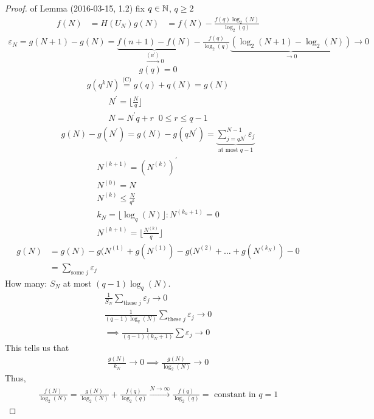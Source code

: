 \documentclass[mfit.tex]{subfiles}
\begin{document}
\begin{proof} of Lemma (2016-03-15, 1.2)
  fix $q \in \mathbb{N}$, $q \geq 2$
  \begin{align*}
    f(N) &= H(U_N)
    g(N) &= f(N) - \frac{f(q) \log_2(N)}{\log_2(q)}
  \end{align*}
  \begin{align*}
    \varepsilon_N = g(N+1) - g(N) = \underbrace{f(n+1) - f(N)}_{\overset{(B^\ast)}{\to} 0} - \frac{f(q)}{\log_2(q)} \underbrace{(\log_2(N+1) - \log_2(N))}_{\to 0} \to 0
  \end{align*}
  \[ g(q) = 0 \]
  \begin{align*}
    g(q^k N) \overset{\text{(C)}}{=} g(q) + q(N) = g(N)
  \end{align*}
  \begin{align*}
    N^\prime = \lfloor \frac{N}{q} \rfloor \\
    N = N^\prime q + r \;\; 0 \leq r \leq q-1
  \end{align*}
  \begin{align*}
    g(N) - g(N^\prime) = g(N) - g(q N^\prime) = \underbrace{\sum_{j=qN^\prime}^{N-1} \varepsilon_j}_{\text{at most } q-1}
  \end{align*}
  \begin{align*}
    N^{(k+1)} = (N^{(k)})^\prime \\
    N^{(0)} = N \\
    N^{(k)} \leq \frac{N}{q^k} \\
    k_N = \lfloor \log_q(N) \rfloor : N^{(k_n+1)} = 0 \\
    N^{(k+1)} = \lfloor \frac{N^{(k)}}{q} \rfloor
  \end{align*}
  \begin{align*}
    g(N) &= g(N) - g(N^{(1)} + g(N^{(1)}) - g(N^{(2)} + \dots + g(N^{(k_N)}) - 0 \\
    &= \sum_{\text{some }j} \varepsilon_j
  \end{align*}
  How many: $S_N$ at most $(q-1)\log_q(N)$.
  \begin{align*}
    \frac{1}{S_N} \sum_{\text{these }j} \varepsilon_j \to 0 \\
    \frac{1}{(q-1) \log_q(N)} \sum_{\text{these }j} \varepsilon_j \to 0 \\
    \implies \frac{1}{(q-1)(k_N+1)} \sum \varepsilon_j \to 0
  \end{align*}
  This tells us that
  \begin{align*}
    \frac{g(N)}{k_N} \to 0 \implies \frac{g(N)}{\log_2(N)} \to 0
  \end{align*}
  Thus,
  \begin{align*}
    \frac{f(N)}{\log_2(N)} = \frac{g(N)}{\log_2(N)} + \frac{f(q)}{\log_2(q)} \overset{N \to \infty}{\to} \frac{f(q)}{\log_2(q)} = \text{ constant in } q = 1
  \end{align*}
\end{proof}
\end{document}
